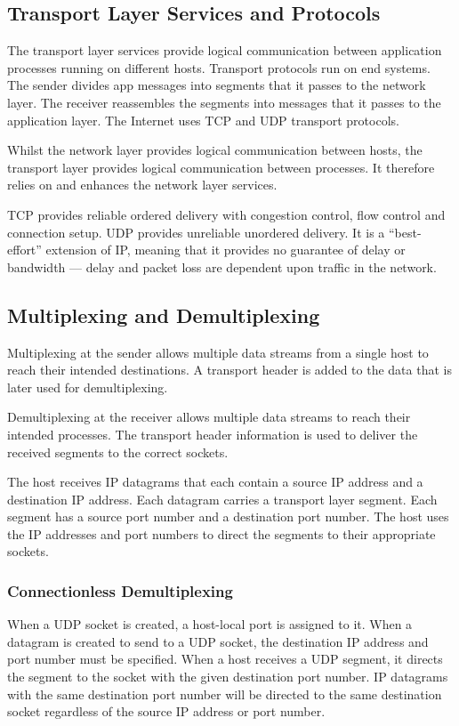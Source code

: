 \subsection{Transport Layer Services and Protocols}

The transport layer services provide logical communication between application processes running on different hosts.
Transport protocols run on end systems.
The sender divides app messages into segments that it passes to the network layer.
The receiver reassembles the segments into messages that it passes to the application layer.
The Internet uses TCP and UDP transport protocols.

Whilst the network layer provides logical communication between hosts, the transport layer provides logical communication between processes.
It therefore relies on and enhances the network layer services.

TCP provides reliable ordered delivery with congestion control, flow control and connection setup.
UDP provides unreliable unordered delivery.
It is a ``best-effort'' extension of IP, meaning that it provides no guarantee of delay or bandwidth --- delay and packet loss are dependent upon traffic in the network.

\subsection{Multiplexing and Demultiplexing}

Multiplexing at the sender allows multiple data streams from a single host to reach their intended destinations.
A transport header is added to the data that is later used for demultiplexing.

Demultiplexing at the receiver allows multiple data streams to reach their intended processes.
The transport header information is used to deliver the received segments to the correct sockets.

The host receives IP datagrams that each contain a source IP address and a destination IP address.
Each datagram carries a transport layer segment.
Each segment has a source port number and a destination port number.
The host uses the IP addresses and port numbers to direct the segments to their appropriate sockets.

\subsubsection{Connectionless Demultiplexing}

When a UDP socket is created, a host-local port is assigned to it.
When a datagram is created to send to a UDP socket, the destination IP address and port number must be specified.
When a host receives a UDP segment, it directs the segment to the socket with the given destination port number.
IP datagrams with the same destination port number will be directed to the same destination socket regardless of the source IP address or port number.


